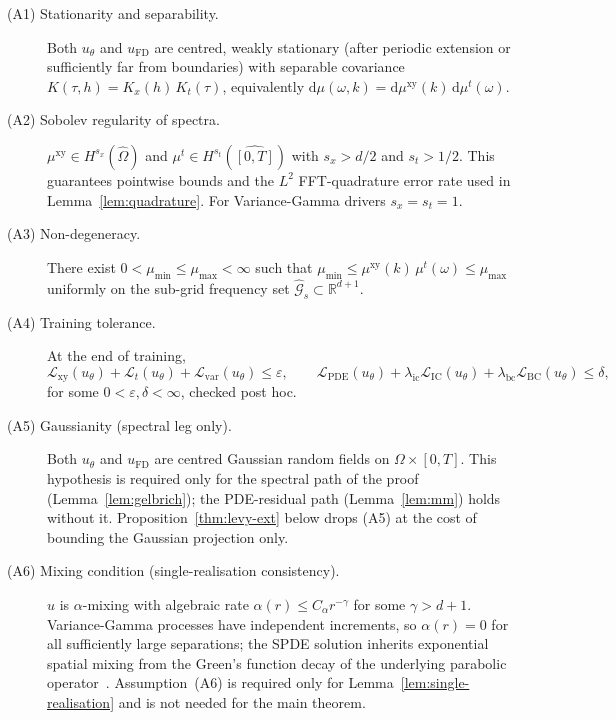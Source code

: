 \documentclass[review,12pt]{elsarticle}
\begin{document}
\begin{description}
\item[(A1) Stationarity and separability.] Both \(u_\theta\) and
\(u_{\mathrm{FD}}\) are centred, weakly stationary (after periodic
extension or sufficiently far from boundaries) with separable
covariance \(K(\tau, h) = K_x(h)\,K_t(\tau)\), equivalently
\(\mathrm d\mu(\omega, k) = \mathrm d\mu^{\mathrm{xy}}(k)\,
\mathrm d\mu^t(\omega)\).

\item[(A2) Sobolev regularity of spectra.]
\(\mu^{\mathrm{xy}} \in H^{s_x}(\widehat\Omega)\) and
\(\mu^t \in H^{s_t}(\widehat{[0,T]})\) with \(s_x > d/2\) and
\(s_t > 1/2\). This guarantees pointwise bounds and the \(L^2\)
FFT-quadrature error rate used in Lemma~\ref{lem:quadrature}.
For Variance-Gamma drivers \(s_x = s_t = 1\).

\item[(A3) Non-degeneracy.] There exist
\(0 < \mu_{\min} \le \mu_{\max} < \infty\) such that
\(\mu_{\min} \le \mu^{\mathrm{xy}}(k)\,\mu^t(\omega) \le \mu_{\max}\)
uniformly on the sub-grid frequency set
\(\widehat{\mathcal G}_s \subset \mathbb R^{d+1}\).

\item[(A4) Training tolerance.] At the end of training,
\begin{equation}
\mathcal L_{\mathrm{xy}}(u_\theta) + \mathcal L_t(u_\theta)
+ \mathcal L_{\mathrm{var}}(u_\theta) \le \varepsilon, \qquad
\mathcal L_{\mathrm{PDE}}(u_\theta)
+ \lambda_{\mathrm{ic}}\mathcal L_{\mathrm{IC}}(u_\theta)
+ \lambda_{\mathrm{bc}}\mathcal L_{\mathrm{BC}}(u_\theta)
\le \delta,
\label{eq:tolerance}
\end{equation}
for some \(0 < \varepsilon, \delta < \infty\), checked post hoc.

\item[(A5) Gaussianity (spectral leg only).] Both \(u_\theta\) and
\(u_{\mathrm{FD}}\) are centred Gaussian random fields on
\(\Omega \times [0,T]\). This hypothesis is required only for the
spectral path of the proof (Lemma~\ref{lem:gelbrich}); the
PDE-residual path (Lemma~\ref{lem:mm}) holds without it.
Proposition~\ref{thm:levy-ext} below drops (A5) at the cost of
bounding the Gaussian projection only.

\item[(A6) Mixing condition (single-realisation consistency).]
\(u\) is \(\alpha\)-mixing with algebraic rate
\(\alpha(r) \le C_\alpha r^{-\gamma}\) for some \(\gamma > d+1\).
Variance-Gamma processes have independent increments, so
\(\alpha(r) = 0\) for all sufficiently large separations; the SPDE
solution inherits exponential spatial mixing from the Green's
function decay of the underlying parabolic operator~\cite{ContTankov2003}.
Assumption~(A6) is required only for
Lemma~\ref{lem:single-realisation} and is not needed for the main
theorem.


\end{description}
\end{document}
